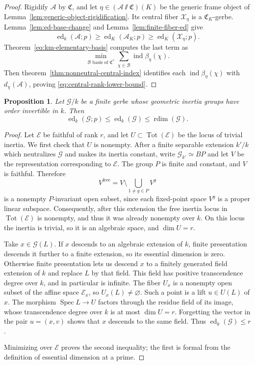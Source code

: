 \documentclass[11pt,reqno]{amsart}
\numberwithin{equation}{section}
\theoremstyle{plain}
\newtheorem{prop}{Proposition}[section]
\theoremstyle{definition}
\def\cA{{\mathcal A}}
\def\cG{{\mathcal G}}
\def\cX{{\mathcal X}}
\def\cE{{\mathcal E}}
\def\fC{{\mathfrak C}}
\def\ind{{\operatorname{ind}}}
\def\Spec{{\operatorname{Spec}}}
\def\Tot{{\operatorname{Tot}}}
\def\rdim{{\operatorname{rdim}}}
\def\ed{{\operatorname{ed}}}
\begin{document}
\begin{proof}
Rigidify $\cA$ by $\fC$, and let
$\eta\in(\cA\sslash\fC)(K)$ be the generic frame object of
Lemma~\ref{lem:generic-object-rigidification}.  Its central fiber
$\cX_\eta$ is a $\fC_K$-gerbe.  Lemma~\ref{lem:ed-base-change} and
Lemma~\ref{lem:finite-fiber-ed} give
\[
\ed_k(\cA;p)\ge
\ed_K(\cA_K;p)\ge
\ed_K(\cX_\eta;p).
\]
Theorem~\ref{eq:km-elementary-basis} computes the last term as
\[
\min_{\mathcal B\text{ basis of }\fC^*}
\sum_{\chi\in\mathcal B}\ind\beta_\eta(\chi).
\]
Then theorem~\ref{thm:nonneutral-central-index} identifies each
$\ind\beta_\eta(\chi)$ with $d_\chi(\cA)$, proving
\eqref{eq:central-rank-lower-bound}.
\end{proof}


\begin{prop}\label{prop:ed-upper-main}
Let $\cG/k$ be a finite gerbe whose geometric inertia groups have order
invertible in $k$.  Then
\[
\ed_k(\cG;p)\le\ed_k(\cG)\le\rdim(\cG).
\]
\end{prop}

\begin{proof}
Let $\cE$ be faithful of rank $r$, and let $U\subset\Tot(\cE)$ be the
locus of trivial inertia.  We first check that $U$ is nonempty.  After a
finite separable extension $k'/k$ which neutralizes $\cG$ and makes its inertia
constant, write $\cG_{k'}\simeq BP$ and let $V$ be the representation
corresponding to $\cE$. The group $P$ is finite and constant, and $V$ is faithful. Therefore
\[
V^{\mathrm{free}}
=V\setminus\bigcup_{1\ne g\in P}V^g
\]
is a nonempty $P$-invariant open subset, since each fixed-point space $V^g$ is a proper linear subspace. Consequently, after this extension the free inertia locus in $\Tot(\cE)$ is nonempty, and thus it was already nonempty over $k$. On this locus the inertia is trivial, so it is an algebraic space, and $\dim U=r$.

Take $x\in\cG(L)$.  If $x$ descends to an algebraic extension of $k$,
finite presentation descends it further to a finite extension, so its
essential dimension is zero.  Otherwise finite presentation lets us
descend $x$ to a finitely generated field extension of $k$ and replace
$L$ by that field.  This field has positive transcendence degree over $k$,
and in particular is infinite.  The fiber $U_x$ is a nonempty open subset
of the affine space $\cE_x$, so $U_x(L)\ne\varnothing$.  Such a point is a
lift $u\in U(L)$ of $x$.
The morphism $\Spec L\to U$ factors through the residue field of its
image, whose transcendence degree over $k$ is at most
$\dim U=r$.  Forgetting the vector in the pair $u=(x,v)$ shows that
$x$ descends to the same field.  Thus $\ed_k(\cG)\le r$.

Minimizing over $\cE$ proves the second inequality; the first is formal
from the definition of essential dimension at a prime.
\end{proof}
\end{document}
